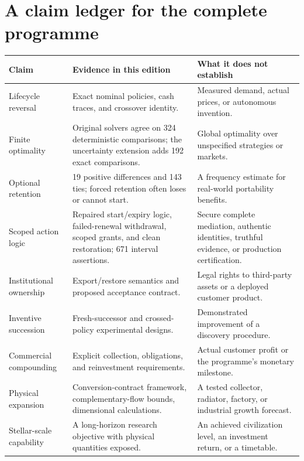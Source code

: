 \section{A claim ledger for the complete programme}
\label{app:claims}
\begin{longtable}{@{}p{}p{}p{}@{}}
\toprule
Claim & Evidence in this edition & What it does not establish\\
\midrule
\endhead
Lifecycle reversal & Exact nominal policies, cash traces, and crossover identity. & Measured demand, actual prices, or autonomous invention.\\[5pt]
Finite optimality & Original solvers agree on 324 deterministic comparisons; the uncertainty extension adds 192 exact comparisons. & Global optimality over unspecified strategies or markets.\\[5pt]
Optional retention & 19 positive differences and 143 ties; forced retention often loses or cannot start. & A frequency estimate for real-world portability benefits.\\[5pt]
Scoped action logic & Repaired start/expiry logic, failed-renewal withdrawal, scoped grants, and clean restoration; 671 interval assertions. & Secure complete mediation, authentic identities, truthful evidence, or production certification.\\[5pt]
Institutional ownership & Export/restore semantics and proposed acceptance contract. & Legal rights to third-party assets or a deployed customer product.\\[5pt]
Inventive succession & Fresh-successor and crossed-policy experimental designs. & Demonstrated improvement of a discovery procedure.\\[5pt]
Commercial compounding & Explicit collection, obligations, and reinvestment requirements. & Actual customer profit or the programme's monetary milestone.\\[5pt]
Physical expansion & Conversion-contract framework, complementary-flow bounds, dimensional calculations. & A tested collector, radiator, factory, or industrial growth forecast.\\[5pt]
Stellar-scale capability & A long-horizon research objective with physical quantities exposed. & An achieved civilization level, an investment return, or a timetable.\\
\bottomrule
\end{longtable}

